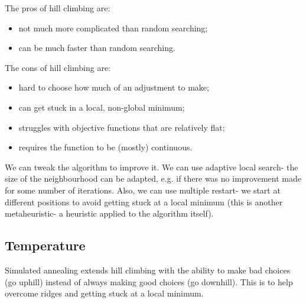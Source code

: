 \documentclass[a4paper, openany]{memoir}
\begin{document}
The pros of hill climbing are:
\begin{itemize}
    \item not much more complicated than random searching;
    \item can be much faster than random searching.
\end{itemize}
The cons of hill climbing are:
\begin{itemize}
    \item hard to choose how much of an adjustment to make;
    \item can get stuck in a local, non-global minimum;
    \item struggles with objective functions that are relatively flat;
    \item requires the function to be (mostly) continuous.
\end{itemize}

We can tweak the algorithm to improve it. We can use adaptive local search- the size of the neighbourhood can be adapted, e.g. if there was no improvement made for some number of iterations. Also, we can use multiple restart- we start at different positions to avoid getting stuck at a local minimum (this is another metaheuristic- a heuristic applied to the algorithm itself).

\subsection{Temperature}
Simulated annealing extends hill climbing with the ability to make bad choices (go uphill) instead of always making good choices (go downhill). This is to help overcome ridges and getting stuck at a local minimum.
\end{document}
